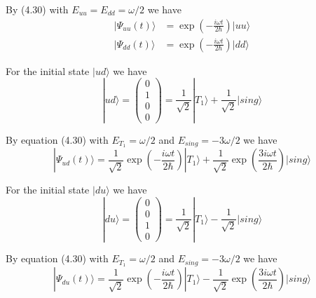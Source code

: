 \documentclass[12pt]{article}
\begin{document}
By (4.30) with $E_{uu}=E_{dd}=\omega/2$ we have
\begin{align*}
|\Psi_{uu}(t)\rangle&=\exp\left(-\frac{i\omega t}{2\hbar}\right)|uu\rangle
\\
|\Psi_{dd}(t)\rangle&=\exp\left(-\frac{i\omega t}{2\hbar}\right)|dd\rangle
\end{align*}

For the initial state $|ud\rangle$ we have
\begin{equation*}
|ud\rangle=\begin{pmatrix}0\\1\\0\\0\end{pmatrix}
=\frac{1}{\sqrt2}|T_1\rangle+\frac{1}{\sqrt2}|sing\rangle
\end{equation*}

By equation (4.30) with $E_{T_1}=\omega/2$ and $E_{sing}=-3\omega/2$ we have
\begin{equation*}
|\Psi_{ud}(t)\rangle
=\frac{1}{\sqrt2}\exp\left(-\frac{i\omega t}{2\hbar}\right)|T_1\rangle
+\frac{1}{\sqrt2}\exp\left(\frac{3i\omega t}{2\hbar}\right)|sing\rangle
\end{equation*}

For the initial state $|du\rangle$ we have
\begin{equation*}
|du\rangle=\begin{pmatrix}0\\0\\1\\0\end{pmatrix}
=\frac{1}{\sqrt2}|T_1\rangle-\frac{1}{\sqrt2}|sing\rangle
\end{equation*}

By equation (4.30) with $E_{T_1}=\omega/2$ and $E_{sing}=-3\omega/2$ we have
\begin{equation*}
|\Psi_{du}(t)\rangle
=\frac{1}{\sqrt2}\exp\left(-\frac{i\omega t}{2\hbar}\right)|T_1\rangle
-\frac{1}{\sqrt2}\exp\left(\frac{3i\omega t}{2\hbar}\right)|sing\rangle
\end{equation*}
\end{document}
